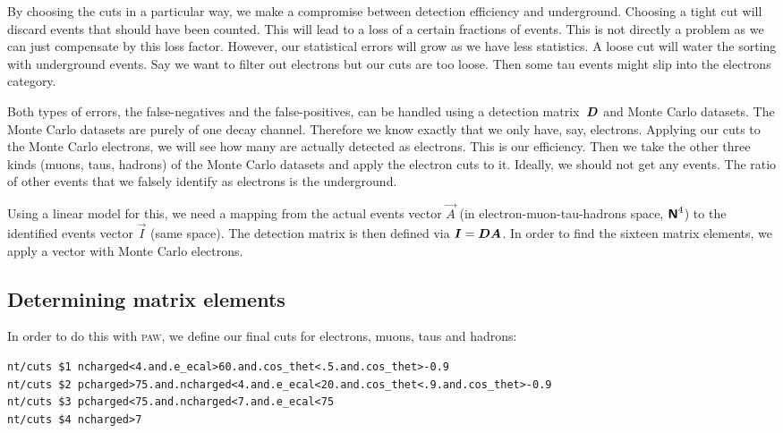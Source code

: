 \documentclass[11pt, english, fleqn, DIV=15, headinclude, BCOR=2cm]{scrreprt}
\begin{document}
By choosing the cuts in a particular way, we make a compromise between
detection efficiency and underground. Choosing a tight cut will discard events
that should have been counted. This will lead to a loss of a certain fractions
of events. This is not directly a problem as we can just compensate by this
loss factor. However, our statistical errors will grow as we have less
statistics. A loose cut will water the sorting with underground events. Say we
want to filter out electrons but our cuts are too loose. Then some tau events
might slip into the electrons category.

Both types of errors, the false-negatives and the false-positives, can be
handled using a detection matrix~$\mat D$ and Monte Carlo datasets.
The Monte Carlo datasets are purely of one decay channel. Therefore we know
exactly that we only have, say, electrons. Applying our cuts to the Monte Carlo
electrons, we will see how many are actually detected as electrons. This is our
efficiency. Then we take the other three kinds (muons, taus, hadrons) of the
Monte Carlo datasets and apply the electron cuts to it. Ideally, we should not
get any events. The ratio of other events that we falsely identify as electrons
is the underground.

Using a linear model for this, we need a mapping from the actual events vector
$\vec A$ (in electron-muon-tau-hadrons space, $\text{\bfseries\sffamily{N}}^4$) to the identified events
vector $\vec I$ (same space). The detection matrix is then defined via $\vec I
= \mat D \vec A$. In order to find the sixteen matrix elements, we apply a
vector with Monte Carlo electrons.


\subsection{Determining matrix elements}

In order to do this with \textsc{paw}, we define our final cuts for electrons,
muons, taus and hadrons:

\begin{lstlisting}
nt/cuts $1 ncharged<4.and.e_ecal>60.and.cos_thet<.5.and.cos_thet>-0.9
nt/cuts $2 pcharged>75.and.ncharged<4.and.e_ecal<20.and.cos_thet<.9.and.cos_thet>-0.9
nt/cuts $3 pcharged<75.and.ncharged<7.and.e_ecal<75
nt/cuts $4 ncharged>7
\end{lstlisting}
\end{document}
